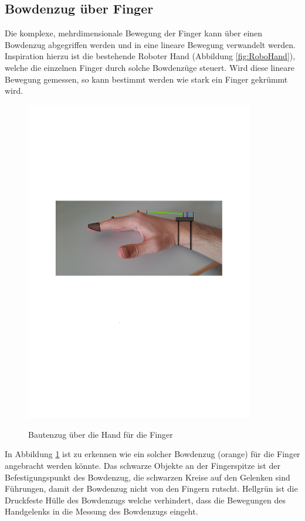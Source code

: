 \documentclass[a4paper,12pt,final]{article} %
\numberwithin{equation}{section} %
\numberwithin{figure}{section} %
\numberwithin{table}{section} %
\begin{document}
\subsection{Bowdenzug über Finger}
Die komplexe, mehrdimensionale Bewegung der Finger kann über einen Bowdenzug abgegriffen werden und in eine lineare Bewegung verwandelt werden.
Inspiration hierzu ist die bestehende Roboter Hand (Abbildung \ref{fig:RoboHand}), welche die einzelnen Finger durch solche Bowdenzüge steuert.
Wird diese lineare Bewegung gemessen, so kann bestimmt werden wie stark ein Finger gekrümmt wird. 
\begin{figure}[H]
	\begin{center}
		\includegraphics[width=10cm]{Bilder/HandPhoto1.pdf}
		\label{fig:HandFinger}
		\caption{Bautenzug über die Hand für die Finger}
	\end{center}
\end{figure}
In Abbildung \ref{fig:HandFinger} ist zu erkennen wie ein solcher Bowdenzug (orange) für die Finger angebracht werden könnte.
Das schwarze Objekte an der Fingerspitze ist der Befestigungspunkt des Bowdenzug, die schwarzen Kreise auf den Gelenken sind Führungen, damit der Bowdenzug nicht von den Fingern rutscht.
Hellgrün ist die Druckfeste Hülle des Bowdenzugs welche verhindert, dass die Bewegungen des Handgelenks in die Messung des Bowdenzugs eingeht.
\end{document}
